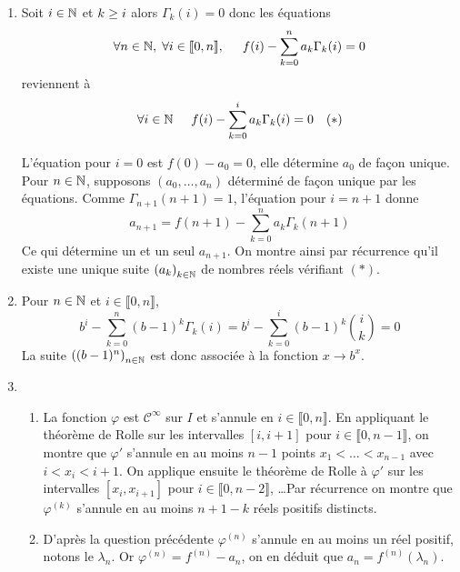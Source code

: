 \begin{enumerate}
\item Soit $i\in\mathbb{N}$ et $k\geq i$ alors $\Gamma_k(i)=0$ donc les équations
\begin{displaymath}
 \forall n\in\mathbb{N},\; \forall i \in \llbracket 0, n\rrbracket,\hspace{0.5cm}f(i) - \sum_{k=0}^na_k\Gamma_k(i) = 0
\end{displaymath}
reviennent à 
\begin{displaymath}
 \forall i\in\mathbb{N} \hspace{0.5cm}f(i) - \sum_{k=0}^ia_k\Gamma_k(i) = 0 \quad (*)
\end{displaymath}

L'équation pour $i=0$ est $f(0)-a_0=0$, elle détermine $a_0$ de façon unique.\newline
Pour $n\in\mathbb{N}$, supposons $(a_0,\dots,a_n)$ déterminé de façon unique par les équations. Comme $\Gamma_{n+1}(n+1)=1$, l'équation pour $i=n+1$  donne
\begin{displaymath}
a_{n+1}=f(n+1) - \sum_{k=0}^na_k\Gamma_k(n+1) 
\end{displaymath}
Ce qui détermine un et un seul $a_ {n+1}$. On montre ainsi  par récurrence  qu'il existe  une unique suite $\left( a_k\right) _{k\in \mathbb{N}}$ de nombres réels vérifiant $(*)$.
\item Pour $n\in\mathbb{N}$ et $i \in \llbracket 0, n\rrbracket$,
\begin{displaymath}
 b^i-\sum_{k=0}^n(b-1)^k\Gamma_k(i)=b^i-\sum_{k=0}^i(b-1)^k\binom{i}{k}=0
\end{displaymath}
La suite $\left( (b-1)^n\right)_{n\in \mathbb{N}}$ est donc associée à la fonction $x \rightarrow b^x$.
\item 
\begin{enumerate}
\item La fonction $\varphi$ est $\mathcal{C}^{\infty}$  sur $I$ et s'annule en $i\in \llbracket 0, n\rrbracket$. En appliquant le théorème de Rolle sur les intervalles $[i, i+1]$ pour $i\in \llbracket 0, n-1\rrbracket$, on montre que $\varphi'$ s'annule en au moins $n-1$ points $x_1<\dots<x_{n-1}$ avec $i<x_i<i+1$. On applique ensuite le théorème de Rolle à $\varphi'$ sur les intervalles $[x_i, x_{i+1}]$ pour $i\in \llbracket 0, n-2\rrbracket$, \dots Par récurrence on montre que $\varphi^{(k)}$  s'annule en au moins $n+1-k$ réels positifs distincts.
\item D'après la question précédente $\varphi^{(n)}$  s'annule en au moins un réel positif, notons le $\lambda_n$.
Or $\varphi^{(n)}=f^{(n)}-a_n$, on en déduit que $a_n = f^{(n)}(\lambda_n)$.   
\end{enumerate}
\end{enumerate}

